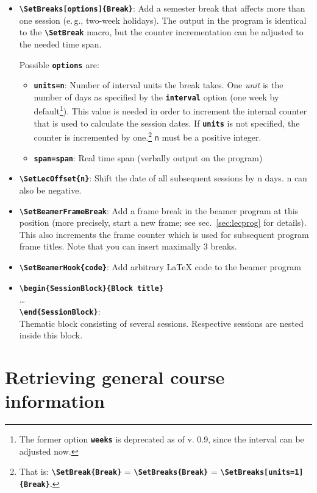 \documentclass[english]{article}
\newcommand*\jmacro[1]{\textbf{\texttt{#1}}}
\newcommand*\jcsmacro[1]{\jmacro{\textbackslash{#1}}}
\newcommand*\joption[1]{\textbf{\texttt{#1}}}
\newcommand*\jfoption[1]{\texttt{#1}}
\newcommand*\jparam[1]{\angus #1\angud}
\begin{document}
\begin{itemize}
\item \jcsmacro{SetBreaks[\jparam{options}]\{Break\}}: Add
a semester break that affects more than one session (e.\,g., two-week holidays).
The output in the program is identical to the \jcsmacro{SetBreak} macro,
but the counter incrementation can be adjusted to the needed time span.

Possible \jmacro{\jparam{options}} are:
\begin{itemize}
\item \joption{units=\jparam{n}}: Number of interval units the break takes. One \emph{unit}
    is the number of days as specified by the \joption{interval} option (one week by
    default\footnote{The former option \joption{weeks} is deprecated as of v. 0.9,
    since the interval can be adjusted now.}).
    This value is needed in order to increment the internal counter that is used to
    calculate the session dates. If \joption{units} is not specified, the counter is
    incremented by one.\footnote{That is: \jcsmacro{SetBreak\{Break\}} =
    \jcsmacro{SetBreaks\{Break\}} = \jcsmacro{SetBreaks[units=1]\{Break\}}.}
    \jfoption{\jparam{n}} must be a positive integer.
\item \joption{span=\jparam{span}}: Real time span (verbally output on the program)
\end{itemize}
\item \jcsmacro{SetLecOffset\{\jparam{n}\}}: Shift the date of all subsequent sessions by \jparam{n} days.
    \jparam{n} can also be negative.
\item \jcsmacro{SetBeamerFrameBreak}: Add a frame break in the beamer program at this position
    (more precisely, start a new frame; see sec.~\ref{sec:lecprog} for details).
    This also increments the frame counter which is used for subsequent program
    frame titles. Note that you can insert maximally 3 breaks.
\item \jcsmacro{SetBeamerHook\{\jparam{code}\}}: Add arbitrary LaTeX code to the
beamer program
\item \jcsmacro{begin\{SessionBlock\}\{\jparam{Block title}\}}\\
\ldots{} \\
\jcsmacro{end\{SessionBlock\}}:\\
Thematic block consisting of several sessions. Respective sessions
are nested inside this block.
\end{itemize}

\section{Retrieving general course information\label{sec:general-course-info}}
\end{document}
